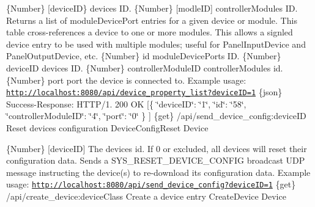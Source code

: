 \{Number\} \mbox{[}device\+ID\} device\textquotesingle{}s ID.  \{Number\} \mbox{[}modle\+ID\mbox{]} controller\+Module\textquotesingle{}s ID.  Returns a list of module\+Device\+Port entries for a given device or module. This table cross-\/references a device to one or more modules. This allows a signled device entry to be used with multiple modules; useful for Panel\+Input\+Device and Panel\+Output\+Device, etc.  \{Number\} id module\+Device\+Port\textquotesingle{}s ID.  \{Number\} device\+ID device\textquotesingle{}s ID.  \{Number\} controller\+Module\+ID controller\+Module\textquotesingle{}s id.  \{Number\} port port the device is connected to.  Example usage\+: \href{http://localhost:8080/api/device_property_list?deviceID=1}{\tt http\+://localhost\+:8080/api/device\+\_\+property\+\_\+list?device\+I\+D=1}  \{json\} Success-\/\+Response\+: H\+T\+T\+P/1. 200 OK \mbox{[}\{ \char`\"{}device\+I\+D\char`\"{}\+: \char`\"{}1\char`\"{}, \char`\"{}id\char`\"{}\+: \char`\"{}58\char`\"{}, \char`\"{}controller\+Module\+I\+D\char`\"{}\+: \char`\"{}4\char`\"{}, \char`\"{}port\char`\"{}\+: \char`\"{}0\char`\"{} \} \mbox{]}  \{get\} /api/send\+\_\+device\+\_\+config\+:device\+ID Reset device\textquotesingle{}s configuration  Device\+Config\+Reset  Device

\{Number\} \mbox{[}device\+ID\mbox{]} The device\textquotesingle{}s id. If 0 or excluded, all devices will reset their configuration data.  Sends a S\+Y\+S\+\_\+\+R\+E\+S\+E\+T\+\_\+\+D\+E\+V\+I\+C\+E\+\_\+\+C\+O\+N\+F\+IG broadcast U\+DP message instructing the device(s) to re-\/download its configuration data.  Example usage\+: \href{http://localhost:8080/api/send_device_config?deviceID=1}{\tt http\+://localhost\+:8080/api/send\+\_\+device\+\_\+config?device\+I\+D=1}  \{get\} /api/create\+\_\+device\+:device\+Class Create a device entry  Create\+Device  Device

